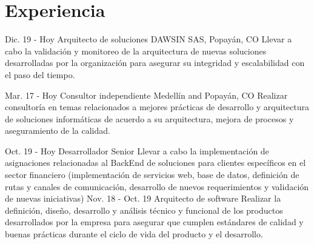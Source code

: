 \documentclass[]{cv-class}
\begin{document}
\section{Experiencia}
\begin{entrylist}
	\entry
	{Dic. 19 - Hoy}
	{Arquitecto de soluciones}
	{DAWSIN SAS, Popayán, CO}
	{Llevar a cabo la validación y monitoreo de la arquitectura de nuevas soluciones desarrolladas por la organización para asegurar su integridad y escalabilidad con el paso del tiempo.}

	\entry
	{Mar. 17 - Hoy}
	{Consultor independiente}
	{Medellín and Popayán, CO}
	{Realizar consultoría en temas relacionados a mejores prácticas de desarrollo y arquitectura de soluciones informáticas de acuerdo a su arquitectura, mejora de procesos y aseguramiento de la calidad.}
	  
	\entry
	{Oct. 19 - Hoy}
	{Desarrollador Senior}
	{\href{https://tecso.coop/}{}}
	{Llevar a cabo la implementación de asignaciones relacionadas al BackEnd de soluciones para clientes específicos en el sector financiero (implementación de servicios web, base de datos, definición de rutas y canales de comunicación, desarrollo de nuevos requerimientos y validación de nuevas iniciativas)}
	\entry
	{Nov. 18 - Oct. 19}
	{Arquitecto de software}
	{\href{http://www.serviciosenweb.com/}{ }}
	{Realizar la definición, diseño, desarrollo y análisis técnico y funcional de los productos desarrollados por la empresa para asegurar que cumplen estándares de calidad y buenas prácticas durante el ciclo de vida del producto y el desarrollo.}
	    

\end{entrylist}
\end{document}
